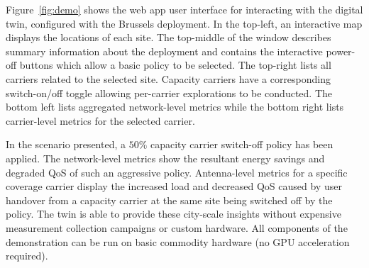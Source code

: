 \documentclass[sigconf, 10pt, review]{acmart}
\begin{document}
Figure~\ref{fig:demo} shows the web app user interface for interacting with the digital twin, configured with the Brussels deployment. In the top-left, an interactive map displays the locations of each site. The top-middle of the window describes summary information about the deployment and contains the interactive power-off buttons which allow a basic policy to be selected. The top-right lists all carriers related to the selected site. Capacity carriers have a corresponding switch-on/off toggle allowing per-carrier explorations to be conducted. The bottom left lists aggregated network-level metrics while the bottom right lists carrier-level metrics for the selected carrier.

In the scenario presented, a $50\%$ capacity carrier switch-off policy has been applied. The network-level metrics show the resultant energy savings and degraded \ac{QoS} of such an aggressive policy. Antenna-level metrics for a specific coverage carrier display the increased load and decreased \ac{QoS} caused by user handover from a capacity carrier at the same site being switched off by the policy. The twin is able to provide these city-scale insights without expensive measurement collection campaigns or custom hardware. All components of the demonstration can be run on basic commodity hardware (no GPU acceleration required).
\vspace*{-0.7em}



\end{document}
